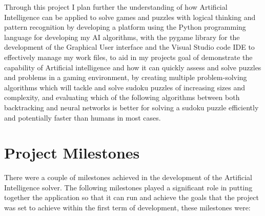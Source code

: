 \documentclass[]{final_report}
\begin{document}
Through this project I plan further the understanding of how Artificial Intelligence can be applied to solve games and puzzles with logical thinking and pattern recognition by developing a platform using the Python programming language for developing my AI algorithms, with the pygame library for the development of the Graphical User interface and the Visual Studio code IDE to effectively manage my work files, to aid in my projects goal of demonstrate the capability of Artificial intelligence and how it can quickly assess and solve puzzles and problems in a gaming environment, by creating multiple problem-solving algorithms which will tackle and solve sudoku puzzles of increasing sizes and complexity, and evaluating which of the following algorithms between both backtracking and neural networks is better  for solving a sudoku puzzle efficiently and potentially faster than humans in most cases. 

\section{Project Milestones}

There were a couple of milestones achieved in the development of the Artificial Intelligence solver. The following milestones played a significant role in putting together the application so that it can run and achieve the goals that the project was set to achieve within the first term of development, these milestones were: 
\end{document}
